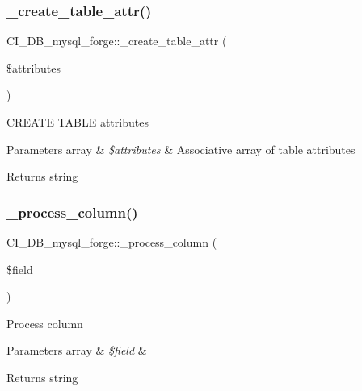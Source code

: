 \subsubsection{\texorpdfstring{\+\_\+create\+\_\+table\+\_\+attr()}{\_create\_table\_attr()}}
{\footnotesize\ttfamily C\+I\+\_\+\+D\+B\+\_\+mysql\+\_\+forge\+::\+\_\+create\+\_\+table\+\_\+attr (\begin{DoxyParamCaption}\item[{}]{\$attributes }\end{DoxyParamCaption})\hspace{0.3cm}{\ttfamily [protected]}}

C\+R\+E\+A\+TE T\+A\+B\+LE attributes


\begin{DoxyParams}[1]{Parameters}
array & {\em \$attributes} & Associative array of table attributes \\
\hline
\end{DoxyParams}
\begin{DoxyReturn}{Returns}
string 
\end{DoxyReturn}
\mbox{\label{class_c_i___d_b__mysql__forge_adad9f5ac5abf479ef6b97bcded8ad6f0}} 
\subsubsection{\texorpdfstring{\+\_\+process\+\_\+column()}{\_process\_column()}}
{\footnotesize\ttfamily C\+I\+\_\+\+D\+B\+\_\+mysql\+\_\+forge\+::\+\_\+process\+\_\+column (\begin{DoxyParamCaption}\item[{}]{\$field }\end{DoxyParamCaption})\hspace{0.3cm}{\ttfamily [protected]}}

Process column


\begin{DoxyParams}[1]{Parameters}
array & {\em \$field} & \\
\hline
\end{DoxyParams}
\begin{DoxyReturn}{Returns}
string 
\end{DoxyReturn}
\mbox{\label{class_c_i___d_b__mysql__forge_a473840d89e768fdde06140be7e657f35}} 
